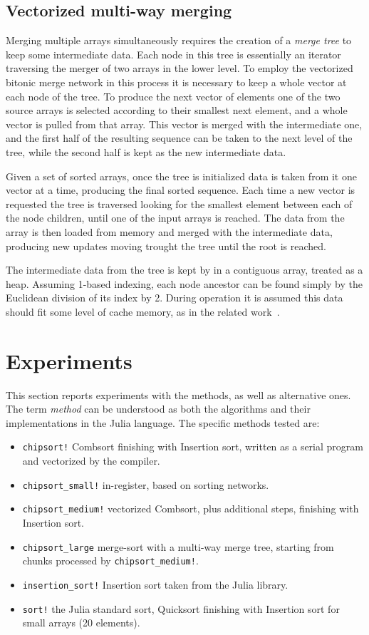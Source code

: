 \documentclass{juliacon}
\begin{document}
\subsection{Vectorized multi-way merging}
%
Merging multiple arrays simultaneously requires the creation of a {\em merge tree} to keep some intermediate data. Each node in this tree is essentially an iterator traversing the merger of two arrays in the lower level. To employ the vectorized bitonic merge network in this process it is necessary to keep a whole vector at each node of the tree. To produce the next vector of elements one of the two source arrays is selected according to their smallest next element, and a whole vector is pulled from that array. This vector is merged with the intermediate one, and the first half of the resulting sequence can be taken to the next level of the tree, while the second half is kept as the new intermediate data.

Given a set of sorted arrays, once the tree is initialized data is taken from it one vector at a time, producing the final sorted sequence. Each time a new vector is requested the tree is traversed looking for the smallest element between each of the node children, until one of the input arrays is reached. The data from the array is then loaded from memory and merged with the intermediate data, producing new updates moving trought the tree until the root is reached.

The intermediate data from the tree is kept by \chipsort in a contiguous array, treated as a heap. Assuming 1-based indexing, each node ancestor can be found simply by the Euclidean division of its index by 2. During operation it is assumed this data should fit some level of cache memory, as in the related work~\cite{DBLP:conf/IEEEpact/InoueMKN07,DBLP:journals/pvldb/ChhuganiNLMHCBKD08,DBLP:journals/pvldb/InoueT15}.


\section{Experiments}
\label{sec:experiments}
%
This section reports experiments with the \chipsort methods, as well as alternative ones. The term {\it method} can be understood as both the algorithms and their implementations in the Julia language. The specific methods tested are:
\begin{itemize}
\item {\tt chipsort!} Combsort finishing with Insertion sort, written as a serial program and vectorized by the compiler.
\item {\tt chipsort\_small!} in-register, based on sorting networks.
\item {\tt chipsort\_medium!} vectorized Combsort, plus additional steps, finishing with Insertion sort.
\item {\tt chipsort\_large} merge-sort with a multi-way merge tree, starting from chunks processed by {\tt chipsort\_medium!}.
\item {\tt insertion\_sort!} Insertion sort taken from the Julia library.
\item {\tt sort!} the Julia standard sort, Quicksort finishing with Insertion sort for small arrays (20 elements).
\end{itemize}
\end{document}
